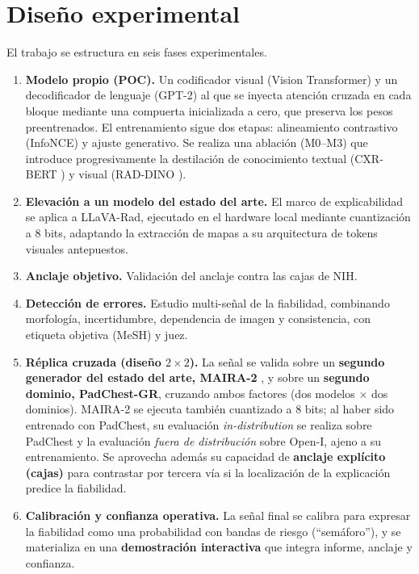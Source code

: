\section{Diseño experimental}
El trabajo se estructura en seis fases experimentales.
\begin{enumerate}
  \item \textbf{Modelo propio (POC).} Un codificador visual (Vision Transformer) y un decodificador
  de lenguaje (GPT-2) al que se inyecta atención cruzada en cada bloque mediante una compuerta
  inicializada a cero, que preserva los pesos preentrenados. El entrenamiento sigue dos etapas:
  alineamiento contrastivo (InfoNCE) y ajuste generativo. Se realiza una ablación (M0--M3) que
  introduce progresivamente la destilación de conocimiento textual (CXR-BERT
  \parencite{boecking2022}) y visual (RAD-DINO \parencite{perezgarcia2024}).
  \item \textbf{Elevación a un modelo del estado del arte.} El marco de explicabilidad se aplica a
  LLaVA-Rad, ejecutado en el hardware local mediante cuantización a 8 bits, adaptando la
  extracción de mapas a su arquitectura de tokens visuales antepuestos.
  \item \textbf{Anclaje objetivo.} Validación del anclaje contra las cajas de NIH.
  \item \textbf{Detección de errores.} Estudio multi-señal de la fiabilidad, combinando morfología,
  incertidumbre, dependencia de imagen y consistencia, con etiqueta objetiva (MeSH) y juez.
  \item \textbf{Réplica cruzada (diseño \(2\times2\)).} La señal se valida sobre un \textbf{segundo
  generador del estado del arte, MAIRA-2} \parencite{maira2}, y sobre un \textbf{segundo dominio,
  PadChest-GR}, cruzando ambos factores (dos modelos \(\times\) dos dominios). MAIRA-2 se ejecuta
  también cuantizado a 8 bits; al haber sido entrenado con PadChest, su evaluación
  \emph{in-distribution} se realiza sobre PadChest y la evaluación \emph{fuera de distribución} sobre
  Open-I, ajeno a su entrenamiento. Se aprovecha además su capacidad de \textbf{anclaje explícito
  (cajas)} para contrastar por tercera vía si la localización de la explicación predice la fiabilidad.
  \item \textbf{Calibración y confianza operativa.} La señal final se calibra para expresar la
  fiabilidad como una probabilidad con bandas de riesgo (``semáforo''), y se materializa en una
  \textbf{demostración interactiva} que integra informe, anclaje y confianza.
\end{enumerate}

